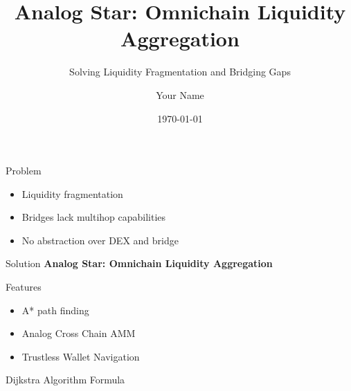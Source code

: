 \documentclass{beamer}
\title{Analog Star: Omnichain Liquidity Aggregation}
\subtitle{Solving Liquidity Fragmentation and Bridging Gaps}
\author{Your Name}
\date{\today}
\begin{document}
\begin{frame}
    \titlepage
\end{frame}

\begin{frame}{Problem}
    \begin{itemize}
        \item Liquidity fragmentation
        \item Bridges lack multihop capabilities
        \item No abstraction over DEX and bridge
    \end{itemize}
\end{frame}

\begin{frame}{Solution}
    \textbf{Analog Star: Omnichain Liquidity Aggregation}
\end{frame}

\begin{frame}{Features}
    \begin{itemize}
        \item A* path finding
        \item Analog Cross Chain AMM
        \item Trustless Wallet Navigation
    \end{itemize}
\end{frame}

\begin{frame}{Dijkstra Algorithm Formula}
\end{frame}
\end{document}
